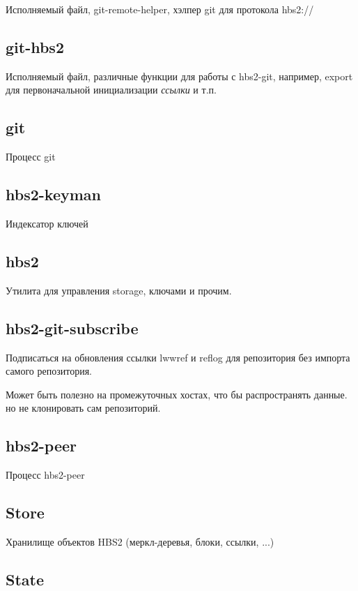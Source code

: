 \documentclass[11pt,a4paper]{article}
\begin{document}
Исполняемый файл, git-remote-helper, хэлпер git для протокола hbs2://

\subsection*{git-hbs2}

Исполняемый файл, различные функции для работы с hbs2-git, например,
export для первоначальной  инициализации \textit{ссылки} и т.п.

\subsection*{git}

Процесс git

\subsection*{hbs2-keyman}

Индексатор ключей

\subsection*{hbs2}

Утилита для управления storage, ключами и прочим.

\subsection*{hbs2-git-subscribe}

Подписаться на обновления ссылки lwwref и reflog для репозитория
без импорта самого репозитория.

Может быть полезно на промежуточных хостах, что бы распространять
данные. но не клонировать сам репозиторий.

\subsection*{hbs2-peer}

Процесс hbs2-peer

\subsection*{Store}

Хранилище объектов HBS2 (меркл-деревья, блоки, ссылки, ...)

\subsection*{State}
\end{document}
